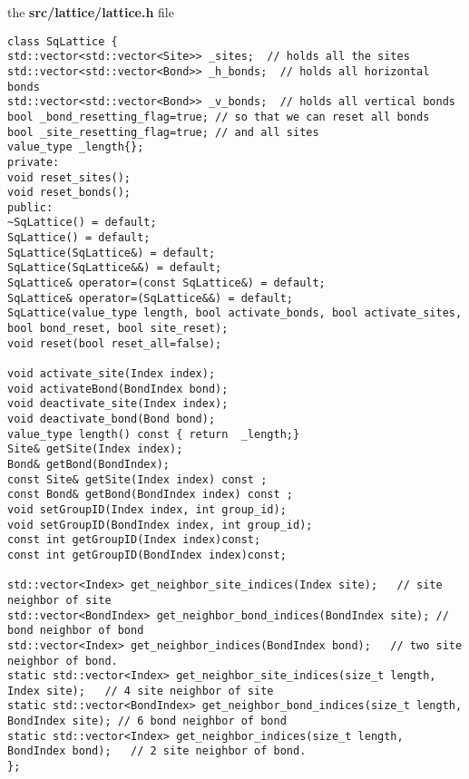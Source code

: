 
the \textbf{src/lattice/lattice.h} file
\begin{lstlisting}[style=CStyle]
class SqLattice {
std::vector<std::vector<Site>> _sites;  // holds all the sites
std::vector<std::vector<Bond>> _h_bonds;  // holds all horizontal bonds
std::vector<std::vector<Bond>> _v_bonds;  // holds all vertical bonds
bool _bond_resetting_flag=true; // so that we can reset all bonds
bool _site_resetting_flag=true; // and all sites
value_type _length{};
private:
void reset_sites();
void reset_bonds();
public:
~SqLattice() = default;
SqLattice() = default;
SqLattice(SqLattice&) = default;
SqLattice(SqLattice&&) = default;
SqLattice& operator=(const SqLattice&) = default;
SqLattice& operator=(SqLattice&&) = default;
SqLattice(value_type length, bool activate_bonds, bool activate_sites, bool bond_reset, bool site_reset);
void reset(bool reset_all=false);

void activate_site(Index index);
void activateBond(BondIndex bond);
void deactivate_site(Index index);
void deactivate_bond(Bond bond);
value_type length() const { return  _length;}
Site& getSite(Index index);
Bond& getBond(BondIndex);
const Site& getSite(Index index) const ;
const Bond& getBond(BondIndex index) const ;
void setGroupID(Index index, int group_id);
void setGroupID(BondIndex index, int group_id);
const int getGroupID(Index index)const;
const int getGroupID(BondIndex index)const;

std::vector<Index> get_neighbor_site_indices(Index site);   // site neighbor of site
std::vector<BondIndex> get_neighbor_bond_indices(BondIndex site); // bond neighbor of bond
std::vector<Index> get_neighbor_indices(BondIndex bond);   // two site neighbor of bond.
static std::vector<Index> get_neighbor_site_indices(size_t length, Index site);   // 4 site neighbor of site
static std::vector<BondIndex> get_neighbor_bond_indices(size_t length, BondIndex site); // 6 bond neighbor of bond
static std::vector<Index> get_neighbor_indices(size_t length, BondIndex bond);   // 2 site neighbor of bond.
};
\end{lstlisting}

